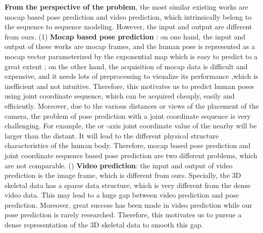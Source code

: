 \documentclass[journal]{IEEEtran}
\begin{document}
{\bf From the perspective of the problem}, the most similar existing works are mocap based pose prediction and video prediction, which intrinsically belong to the sequence to sequence modeling. However, the input and output are different from ours. (1) {\bf Mocap based pose prediction} \cite{MartinezOMP,tprnn,rnmhy,srnnap}: on one hand, the input and output of these works are mocap frames, and the human pose is represented as a mocap vector parameterized by the exponential map which is easy to predict to a great extent \cite{ppruem,TaylorMM,h36m}; on the other hand, the acquisition of mocap data is difficult and expensive, and it needs lots of preprocessing to visualize its performance \cite{TaylorMM,MartinezOMP},which is inefficient and not intuitive. Therefore, this motivates us to predict human poses using joint coordinate sequence, which can be acquired cheaply, easily and efficiently. Moreover, due to the various distances or views of the placement of the camera, the problem of pose prediction with a joint coordinate sequence is very challenging. For example, the  or -axis joint coordinate value of the nearby will be larger than the distant. It will lead to the different physical structure characteristics of the human body. Therefore, mocap based pose prediction and joint coordinate sequence based pose prediction are two different problems, which are not comparable. () {\bf Video prediction}: the input and output of video prediction is the image frame, which is different from ours. Specially, the 3D skeletal data has a sparse data structure, which is very different from the dense video data. This may lead to a huge gap between video prediction and pose prediction. Moreover, great success has been made in video prediction \cite{predcnn,fstvp,ld2rvp,sv2p,ptmois,bbsptb} while our pose prediction is rarely researched. Therefore, this motivates us to pursue a dense representation of the 3D skeletal data to smooth this gap.
\end{document}
